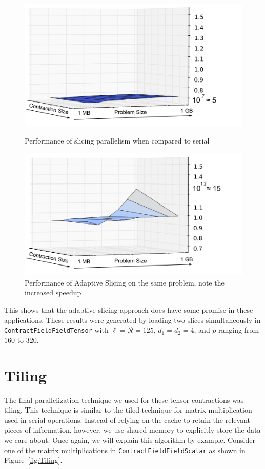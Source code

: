 \begin{figure}[H]
    \centering
    \includegraphics[width=5in]{CFFTSlicingVSSerial}
    \caption{Performance of slicing parallelism when compared to serial}

    \includegraphics[width=5in]{CFFTAdaptiveSlicingVSSerial}
    \caption[Performance of adaptive slicing]{Performance of Adaptive Slicing on
    the same problem, note the increased speedup}
\label{fig:TwoSlicings}
\end{figure}

This shows that the adaptive slicing approach does have some promise in these applications. These results were generated by loading two slices simultaneously in \texttt{ContractFieldFieldTensor} with $\ell = \mathcal{R} = 125$, $d_1 = d_2 = 4$, and $p$ ranging from $160$ to $320$.

\section{Tiling}\label{sec:tiling}

The final parallelization technique we used for these tensor contractions was
tiling. This technique is similar to the tiled technique for matrix
multiplication used in serial operations. Instead of relying on the cache to
retain the relevant pieces of information, however, we use shared memory to
explicitly store the data we care about. Once again, we will explain this
algorithm by example. Consider one of the matrix multiplications in
\texttt{ContractFieldFieldScalar} as shown in Figure~\ref{fig:Tiling}. 


